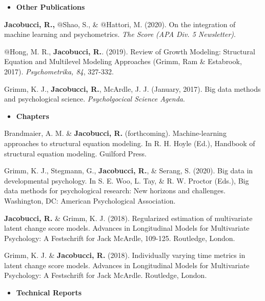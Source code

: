 \documentclass[letterpaper,10pt]{article}
\begin{document}
%
\vspace{3mm}
\begin{itemize}
	\item {\textbf{\large{Other Publications}}}
\end{itemize}
\begin{etaremune}
	\item  \textbf{Jacobucci, R.,} $@$Shao, S., \& $@$Hattori, M. (2020). On the integration of machine learning and psychometrics. \emph{The Score (APA Div. 5 Newsletter)}.
	\item  $@$Hong, M. R., \textbf{Jacobucci, R.}. (2019). Review of Growth Modeling: Structural Equation and Multilevel Modeling Approaches (Grimm, Ram \& Estabrook, 2017). \emph{Psychometrika, 84}, 327-332.
	\item Grimm, K. J., \textbf{Jacobucci, R.}, McArdle, J. J. (January, 2017). Big data methods and psychological science. \emph{Psycholgocical Science Agenda}.
	
\end{etaremune}
\vspace{3mm}
%
%
\begin{itemize}
	\item {\textbf{\large{Chapters}}}
\end{itemize}
\begin{etaremune}
	\item Brandmaier, A. M. \& \textbf{Jacobucci, R.} (forthcoming). Machine-learning approaches to structural
	equation modeling. In R. H. Hoyle (Ed.), Handbook of structural equation modeling.
	Guilford Press.
	\item Grimm, K. J., Stegmann, G., \textbf{Jacobucci, R.}, \& Serang, S. (2020). Big data in developmental psychology. In S. E. Woo, L. Tay, \& R. W. Proctor (Eds.), Big data methods for psychological research: New horizons and challenges. Washington, DC: American Psychological Association.
	\item  \textbf{Jacobucci, R.} \& Grimm, K. J. (2018). Regularized estimation of multivariate latent change score models. Advances in Longitudinal Models for Multivariate Psychology: A Festschrift for Jack McArdle, 109-125. Routledge, London.
	\item Grimm, K. J. \& \textbf{Jacobucci, R.} (2018). Individually varying time metrics in latent change score models. Advances in Longitudinal Models for Multivariate Psychology: A Festschrift for Jack McArdle. Routledge, London.
\end{etaremune}
\begin{itemize}
	\vspace{3mm}
	\item {\textbf{\large{Technical Reports}}}
\end{itemize}
\end{document}
